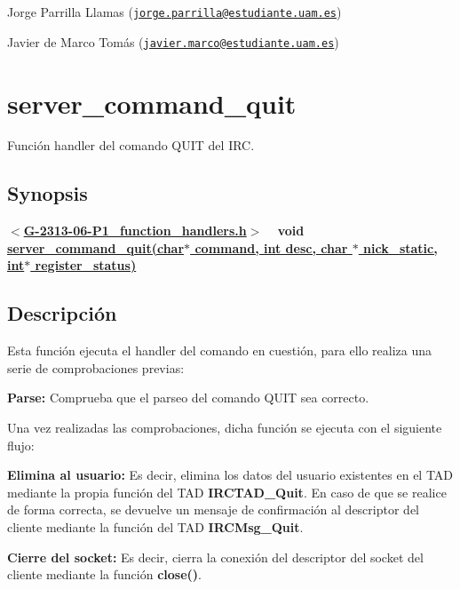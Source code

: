 \begin{DoxyItemize}
\item Jorge Parrilla Llamas (\href{mailto:jorge.parrilla@estudiante.uam.es}{\tt jorge.\+parrilla@estudiante.\+uam.\+es}) 
\item Javier de Marco Tomás (\href{mailto:javier.marco@estudiante.uam.es}{\tt javier.\+marco@estudiante.\+uam.\+es}) 
\end{DoxyItemize}\hypertarget{server_command_quit}{}\section{server\+\_\+command\+\_\+quit}\label{server_command_quit}
Función handler del comando Q\+U\+I\+T del I\+R\+C.\hypertarget{server_command_quit_synopsis_quit}{}\subsection{Synopsis}\label{server_command_quit_synopsis_quit}
{ {\bfseries $<$\hyperlink{G-2313-06-P1__function__handlers_8h}{G-\/2313-\/06-\/\+P1\+\_\+function\+\_\+handlers.\+h}$>$} ~\newline
 {\bfseries void \hyperlink{G-2313-06-P1__function__handlers_8c_a3df99a1f2cefc2d91d65cbb6dd555f96}{server\+\_\+command\+\_\+quit(char$\ast$ command, int desc, char $\ast$ nick\+\_\+static, int$\ast$ register\+\_\+status)}} } \hypertarget{server_command_quit_descripcion_quit}{}\subsection{Descripción}\label{server_command_quit_descripcion_quit}
Esta función ejecuta el handler del comando en cuestión, para ello realiza una serie de comprobaciones previas\+:


\begin{DoxyItemize}
\item {\bfseries Parse\+:} Comprueba que el parseo del comando Q\+U\+I\+T sea correcto. 
\end{DoxyItemize}

Una vez realizadas las comprobaciones, dicha función se ejecuta con el siguiente flujo\+:


\begin{DoxyItemize}
\item {\bfseries Elimina al usuario\+:} Es decir, elimina los datos del usuario existentes en el T\+A\+D mediante la propia función del T\+A\+D {\bfseries I\+R\+C\+T\+A\+D\+\_\+\+Quit}. En caso de que se realice de forma correcta, se devuelve un mensaje de confirmación al descriptor del cliente mediante la función del T\+A\+D {\bfseries I\+R\+C\+Msg\+\_\+\+Quit}.  
\item {\bfseries Cierre del socket\+:} Es decir, cierra la conexión del descriptor del socket del cliente mediante la función {\bfseries close()}.  
\end{DoxyItemize}

